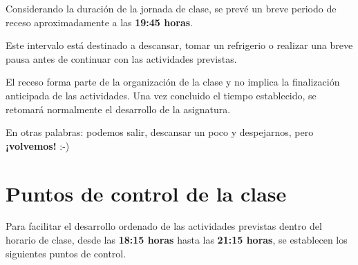 \documentclass[10pt]{article}
\begin{document}
Considerando la duración de la jornada de clase, se prevé un breve periodo
de receso aproximadamente a las \textbf{19:45 horas}.

Este intervalo está destinado a descansar, tomar un refrigerio o realizar
una breve pausa antes de continuar con las actividades previstas.

El receso forma parte de la organización de la clase y no implica la
finalización anticipada de las actividades. Una vez concluido el tiempo
establecido, se retomará normalmente el desarrollo de la asignatura.

En otras palabras: podemos salir, descansar un poco y despejarnos, pero
\textbf{¡volvemos!} :-)


\section{Puntos de control de la clase}

Para facilitar el desarrollo ordenado de las actividades previstas dentro
del horario de clase, desde las \textbf{18:15 horas} hasta las
\textbf{21:15 horas}, se establecen los siguientes puntos de control.
\end{document}
